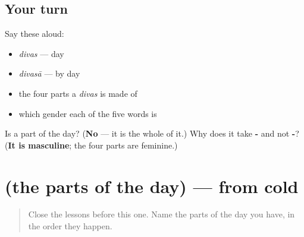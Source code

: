 \subsection*{Your turn}
Say these aloud:

\begin{itemize}
\raggedright
  \item \emph{divas} — day
  \item \emph{divasā} — by day
  \item the four parts a \emph{divas} is made of
  \item which gender each of the five words is
\end{itemize}

\begin{tcolorbox}[breakable,colback=teal!4,colframe=teal!35!black,title={Before you move on}]
Is \textbf{} a part of the day? (\textbf{No} — it is the whole of it.) Why does it take \textbf{-} and not \textbf{-}? (\textbf{It is masculine}; the four parts are feminine.)
\end{tcolorbox}
\section[(the parts of the day)]{(the parts of the day) — from cold}

\label{lesson:MR-R66-day-recall}



\begin{quote}
Close the lessons before this one. Name the parts of the day you have, in the order they happen.
\end{quote}

